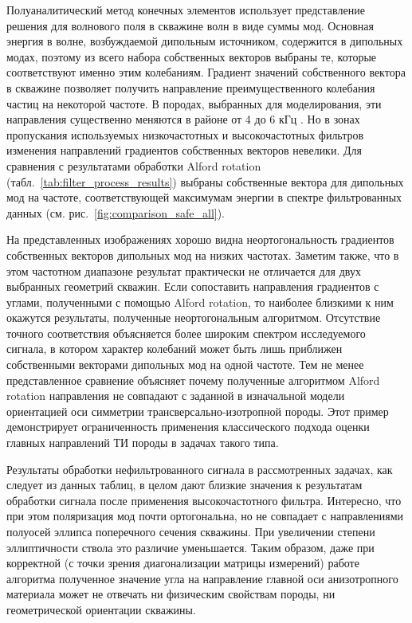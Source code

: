 \documentclass[a4paper,11pt]{article}
\begin{document}
Полуаналитический метод конечных элементов использует представление решения для волнового поля в скважине волн в виде суммы мод. Основная энергия в волне, возбуждаемой дипольным источником, содержится в дипольных модах, поэтому из всего набора собственных векторов выбраны те, которые соответствуют именно этим колебаниям. Градиент значений собственного вектора в скважине позволяет получить направление преимущественного колебания частиц на некоторой частоте. В породах, выбранных для моделирования, эти направления существенно меняются в районе от 4 до 6 кГц \cite{Zharnikov2015}. Но в зонах пропускания используемых низкочастотных и высокочастотных фильтров изменения направлений градиентов собственных векторов невелики. Для сравнения с результатами обработки Alford rotation (табл.~\ref{tab:filter_process_results}) выбраны собственные вектора для дипольных мод на частоте, соответствующей максимумам энергии в спектре фильтрованных данных (см. рис.~\ref{fig:comparison_safe_all}).

На представленных изображениях хорошо видна неортогональность градиентов собственных векторов дипольных мод на низких частотах. Заметим также, что в этом частотном диапазоне результат практически не отличается для двух выбранных геометрий скважин. Если сопоставить направления градиентов с углами, полученными с помощью Alford rotation, то наиболее близкими к ним окажутся результаты, полученные неортогональным алгоритмом. Отсутствие точного соответствия объясняется более широким спектром исследуемого сигнала, в котором характер колебаний может быть лишь приближен собственными векторами дипольных мод на одной частоте. Тем не менее представленное сравнение объясняет почему полученные алгоритмом Alford rotation направления не совпадают с заданной в изначальной модели ориентацией оси симметрии трансверсально-изотропной породы. Этот пример демонстрирует ограниченность применения классического подхода оценки главных направлений ТИ породы в задачах такого типа. 


Результаты обработки нефильтрованного сигнала в рассмотренных задачах, как следует из данных таблиц, в целом дают близкие значения к результатам обработки сигнала после применения высокочастотного фильтра. Интересно, что при этом поляризация мод почти ортогональна, но не совпадает с направлениями полуосей эллипса поперечного сечения скважины. При увеличении степени эллиптичности ствола это различие уменьшается. Таким образом, даже при корректной (с точки зрения диагонализации матрицы измерений) работе алгоритма полученное значение угла на направление главной оси анизотропного материала может не отвечать ни физическим свойствам породы, ни геометрической ориентации скважины. 
\end{document}
